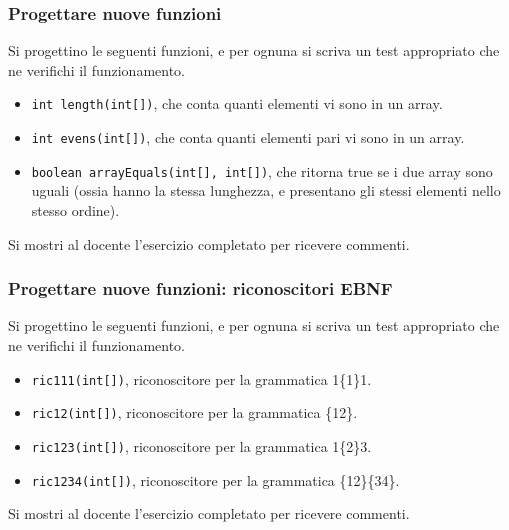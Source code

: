 \documentclass{beamer}
\begin{document}
\begin{frame}[fragile]
\frametitle{Progettare nuove funzioni}
Si progettino le seguenti funzioni, e per ognuna si scriva un test appropriato che ne verifichi il funzionamento.
\begin{itemize}
 \item \texttt{int length(int[])}, che conta quanti elementi vi sono in un array.
 \item \texttt{int evens(int[])}, che conta quanti elementi pari vi sono in un array.
 \item \texttt{boolean arrayEquals(int[], int[])}, che ritorna true se i due array sono uguali (ossia hanno la stessa lunghezza, e presentano gli stessi elementi nello stesso ordine).
\end{itemize}
Si mostri al docente l'esercizio completato per ricevere commenti.
\end{frame}

\begin{frame}[fragile]
\frametitle{Progettare nuove funzioni: riconoscitori EBNF}
Si progettino le seguenti funzioni, e per ognuna si scriva un test appropriato che ne verifichi il funzionamento.
\begin{itemize}
 \item \texttt{ric111(int[])}, riconoscitore per la grammatica 1\{1\}1.
 \item \texttt{ric12(int[])}, riconoscitore per la grammatica \{1\textbar{}2\}.
 \item \texttt{ric123(int[])}, riconoscitore per la grammatica 1\{2\}3.
 \item \texttt{ric1234(int[])}, riconoscitore per la grammatica \{1\textbar{}2\}\{3\textbar{}4\}.
\end{itemize}
Si mostri al docente l'esercizio completato per ricevere commenti.
\end{frame}

\end{document}

